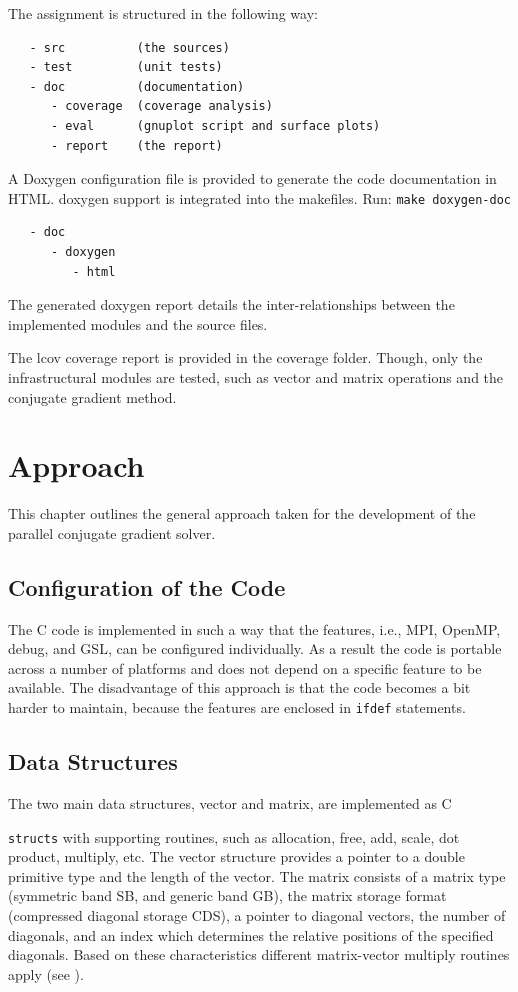 \documentclass[12pt,a4paper]{report}
\def\ccode#1{
  \lstinline[basicstyle=\ttfamily,language=C]{#1} }
\begin{document}
The assignment is structured in the following way:
\begin{verbatim}
   - src          (the sources)
   - test         (unit tests)
   - doc          (documentation)
      - coverage  (coverage analysis)
      - eval      (gnuplot script and surface plots)
      - report    (the report)
\end{verbatim}

A Doxygen configuration file is provided to generate the code
documentation in HTML. doxygen support is integrated into the
makefiles.  Run: \verb=make doxygen-doc=

\begin{verbatim}
   - doc
      - doxygen
         - html
\end{verbatim}

The generated doxygen report details the inter-relationships between
the implemented modules and the source files.

The lcov coverage report is provided in the coverage folder. Though,
only the infrastructural modules are tested, such as vector and matrix
operations and the conjugate gradient method.

\chapter{Approach}
\label{cha:approach}

This chapter outlines the general approach taken for the development
of the parallel conjugate gradient solver.

\section{Configuration of the Code}
\label{sec:configuration-code}

The C code is implemented in such a way that the features, i.e., MPI,
OpenMP, debug, and GSL, can be configured individually. As a result
the code is portable across a number of platforms and does not depend
on a specific feature to be available. The disadvantage of this
approach is that the code becomes a bit harder to maintain, because
the features are enclosed in \ccode{ifdef} statements.

\section{Data Structures}
\label{sec:data-structures}

The two main data structures, vector and matrix, are implemented as C
\ccode{structs} with supporting routines, such as allocation, free,
add, scale, dot product, multiply, etc. The vector structure provides
a pointer to a double primitive type and the length of the vector. The
matrix consists of a matrix type (symmetric band SB, and generic band
GB), the matrix storage format (compressed diagonal storage CDS), a
pointer to diagonal vectors, the number of diagonals, and an index
which determines the relative positions of the specified
diagonals. Based on these characteristics different matrix-vector
multiply routines apply (see ).
\end{document}
